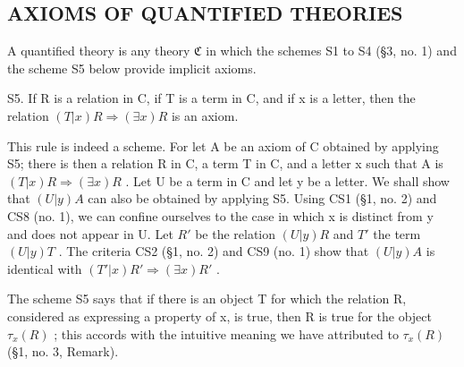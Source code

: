 \subsection{AXIOMS OF QUANTIFIED THEORIES}

A quantified theory is any theory \(\mathfrak{C}\) in which the schemes S1 to S4 (§3, no. 1) and the scheme S5 below provide implicit axioms.

S5. If R is a relation in C, if T is a term in C, and if x is a letter, then the relation \((T|x)R \Longrightarrow (\exists x)R\) is an axiom.

This rule is indeed a scheme. For let A be an axiom of C obtained by applying S5; there is then a relation R in C, a term T in C, and a letter x such that A is \((T|x)R \Longrightarrow (\exists x)R\) . Let U be a term in C and let y be a letter. We shall show that \((U|y)A\) can also be obtained by applying S5. Using CS1 (§1, no. 2) and CS8 (no. 1), we can confine ourselves to the case in which x is distinct from y and does not appear in U. Let \(R'\) be the relation \((U|y)R\) and \(T'\) the term \((U|y)T\) . The criteria CS2 (§1, no. 2) and CS9 (no. 1) show that \((U|y)A\) is identical with \((T'|x)R' \Longrightarrow (\exists x)R'\) .

The scheme S5 says that if there is an object T for which the relation R, considered as expressing a property of x, is true, then R is true for the object \(\tau_{x}(R)\) ; this accords with the intuitive meaning we have attributed to \(\tau_{x}(R)\) (§1, no. 3, Remark).

